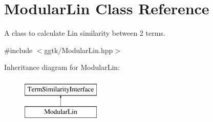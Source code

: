 \hypertarget{classModularLin}{}\section{Modular\+Lin Class Reference}
\label{classModularLin}


A class to calculate Lin similarity between 2 terms.  




{\ttfamily \#include $<$ggtk/\+Modular\+Lin.\+hpp$>$}

Inheritance diagram for Modular\+Lin\+:\begin{figure}[H]
\begin{center}
\leavevmode
\includegraphics[height=2.000000cm]{classModularLin}
\end{center}
\end{figure}
